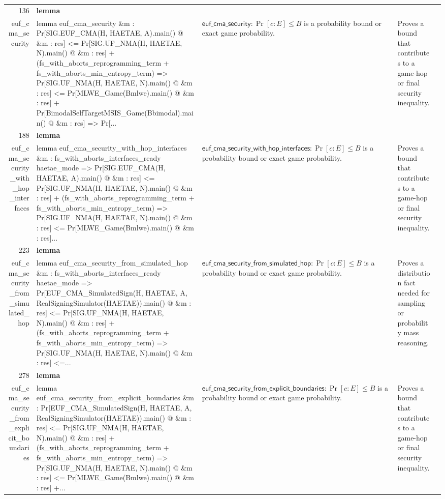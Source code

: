\documentclass[10pt]{article}
\newcommand{\ec}[1]{\begingroup\ttfamily\scriptsize #1\endgroup}
\begin{document}
\begin{longtable}{r L{0.17\textwidth} L{0.26\textwidth} L{0.27\textwidth} L{0.20\textwidth}}
136 & \textbf{lemma}\\\ec{euf\_cma\_security} & \ec{lemma euf\_cma\_security \&m : Pr[SIG.EUF\_CMA(H, HAETAE, A).main() @ \&m : res] <= Pr[SIG.UF\_NMA(H, HAETAE, N).main() @ \&m : res] + (fs\_with\_aborts\_reprogramming\_term + fs\_with\_aborts\_min\_entropy\_term) => Pr[SIG.UF\_NMA(H, HAETAE, N).main() @ \&m : res] <= Pr[MLWE\_Game(Bmlwe).main() @ \&m : res] + Pr[BimodalSelfTargetMSIS\_Game(Bbimodal).main() @ \&m : res] => Pr[...} & \(\mathsf{euf\_cma\_security} : \Pr[c : E] \le B\) is a probability bound or exact game probability. & Proves a bound that contributes to a game-hop or final security inequality. \\
188 & \textbf{lemma}\\\ec{euf\_cma\_security\_with\_hop\_interfaces} & \ec{lemma euf\_cma\_security\_with\_hop\_interfaces \&m : fs\_with\_aborts\_interfaces\_ready haetae\_mode => Pr[SIG.EUF\_CMA(H, HAETAE, A).main() @ \&m : res] <= Pr[SIG.UF\_NMA(H, HAETAE, N).main() @ \&m : res] + (fs\_with\_aborts\_reprogramming\_term + fs\_with\_aborts\_min\_entropy\_term) => Pr[SIG.UF\_NMA(H, HAETAE, N).main() @ \&m : res] <= Pr[MLWE\_Game(Bmlwe).main() @ \&m : res]...} & \(\mathsf{euf\_cma\_security\_with\_hop\_interfaces} : \Pr[c : E] \le B\) is a probability bound or exact game probability. & Proves a bound that contributes to a game-hop or final security inequality. \\
223 & \textbf{lemma}\\\ec{euf\_cma\_security\_from\_simulated\_hop} & \ec{lemma euf\_cma\_security\_from\_simulated\_hop \&m : fs\_with\_aborts\_interfaces\_ready haetae\_mode => Pr[EUF\_CMA\_SimulatedSign(H, HAETAE, A, RealSigningSimulator(HAETAE)).main() @ \&m : res] <= Pr[SIG.UF\_NMA(H, HAETAE, N).main() @ \&m : res] + (fs\_with\_aborts\_reprogramming\_term + fs\_with\_aborts\_min\_entropy\_term) => Pr[SIG.UF\_NMA(H, HAETAE, N).main() @ \&m : res] <=...} & \(\mathsf{euf\_cma\_security\_from\_simulated\_hop} : \Pr[c : E] \le B\) is a probability bound or exact game probability. & Proves a distribution fact needed for sampling or probability mass reasoning. \\
278 & \textbf{lemma}\\\ec{euf\_cma\_security\_from\_explicit\_boundaries} & \ec{lemma euf\_cma\_security\_from\_explicit\_boundaries \&m : Pr[EUF\_CMA\_SimulatedSign(H, HAETAE, A, RealSigningSimulator(HAETAE)).main() @ \&m : res] <= Pr[SIG.UF\_NMA(H, HAETAE, N).main() @ \&m : res] + (fs\_with\_aborts\_reprogramming\_term + fs\_with\_aborts\_min\_entropy\_term) => Pr[SIG.UF\_NMA(H, HAETAE, N).main() @ \&m : res] <= Pr[MLWE\_Game(Bmlwe).main() @ \&m : res] +...} & \(\mathsf{euf\_cma\_security\_from\_explicit\_boundaries} : \Pr[c : E] \le B\) is a probability bound or exact game probability. & Proves a bound that contributes to a game-hop or final security inequality. \\

\end{longtable}
\end{document}
